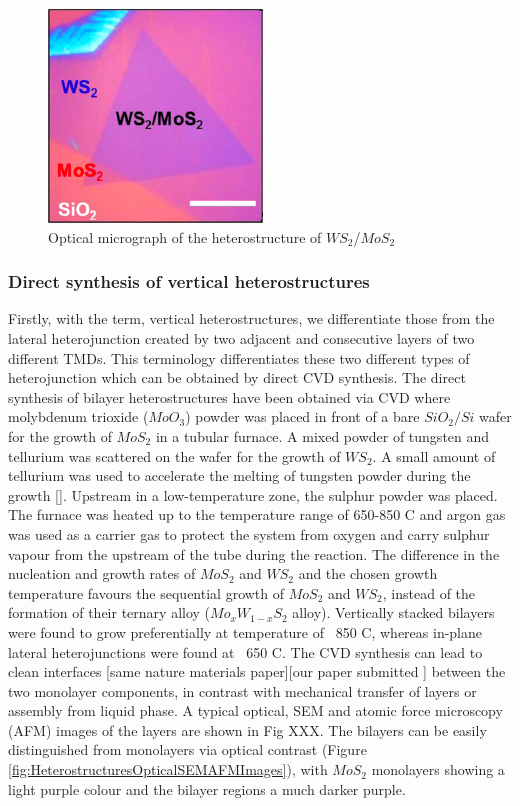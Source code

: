 \begin{figure}[h]
	\begin{center}
		\includegraphics[scale=1]{Heterostructures/HeterostructureOpticalMap.png}
		\caption{Optical micrograph of the heterostructure of $WS_2$/$MoS_2$}
		\label{fig:HeterostructuresOpticalMap}
	\end{center}
\end{figure}

\subsubsection{Direct synthesis of vertical heterostructures}

Firstly, with the term, vertical heterostructures, we differentiate those from the lateral heterojunction created by two adjacent and consecutive layers of two different TMDs.
This terminology differentiates these two different types of heterojunction which can be obtained by direct CVD synthesis.
The direct synthesis of bilayer heterostructures have been obtained via CVD where molybdenum trioxide ($MoO_3$) powder was placed in  front of a bare $SiO_2/Si$ wafer for the growth of $MoS_2$ in a tubular furnace. A mixed powder of tungsten and tellurium was scattered on the wafer for the growth of $WS_2$. A small amount of tellurium was used to accelerate the melting of tungsten powder during the growth []. Upstream in a low-temperature zone, the sulphur powder was placed. The furnace was heated up to the temperature range of 650-850 {\degree}C and argon gas was used as a carrier gas to protect the system from oxygen and carry sulphur vapour from the upstream of the tube during the reaction. The difference in the nucleation and growth rates of $MoS_2$ and $WS_2$ and the chosen growth temperature favours the sequential growth of $MoS_2$ and $WS_2$, instead of  the formation of their ternary alloy ($Mo_xW_{1-x}S_2$ alloy). Vertically stacked bilayers were found to grow preferentially at temperature of ~850 {\degree}C, whereas in-plane lateral heterojunctions were found at ~650 {\degree}C. The CVD  synthesis can lead to clean interfaces [same nature materials paper][our paper submitted ] between the two monolayer components, in contrast with mechanical transfer of layers or assembly from liquid phase. A typical optical, SEM and atomic force microscopy (AFM) images of the layers are shown in Fig XXX. The bilayers can be easily distinguished from monolayers via optical contrast (Figure \ref{fig:HeterostructuresOpticalSEMAFMImages}), with $MoS_2$ monolayers showing a light purple colour and the bilayer regions a much darker purple.

